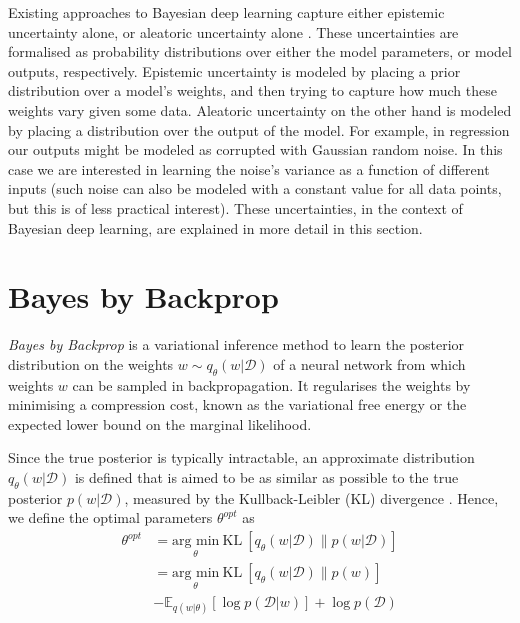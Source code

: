 Existing approaches to Bayesian deep learning capture either epistemic uncertainty alone, or aleatoric uncertainty alone \cite{gal2016thesis}. These uncertainties are formalised as probability distributions over either the model parameters, or model outputs, respectively. Epistemic uncertainty is modeled by placing a prior distribution over a model's weights, and then trying to capture how much these weights vary given some data. Aleatoric uncertainty on the other hand is modeled by placing a distribution over the output of the model. For example, in regression our outputs might be modeled as corrupted with Gaussian random noise. In this case we are interested in learning the noise's variance as a function of different inputs (such noise can also be modeled with a constant value for all data points, but this is of less practical interest). These uncertainties, in the context of Bayesian deep learning, are explained in more detail in this section. 

\section{Bayes by Backprop}
\textit{Bayes by Backprop} \cite{graves2011practical, blundell2015weight} is a variational inference method to learn the posterior distribution on the weights $w \sim q_{\theta}(w|\mathcal{D})$ of a neural network from which weights $w$ can be sampled in backpropagation. 
It regularises the weights by minimising a compression cost, known as the variational free energy or the expected lower bound on the marginal likelihood.

Since the true posterior is typically intractable, an approximate distribution $q_{\theta}(w|\mathcal{D})$ is defined that is aimed to be as similar as possible to the true posterior $p(w|\mathcal{D})$, measured by the Kullback-Leibler (KL) divergence \cite{kullback1951information}. Hence, we define the optimal parameters $\theta^{opt}$ as
\begin{equation}
    \begin{aligned} \label{KL}
        \theta^{opt}&=\underset{\theta}{\text{arg min}}\ \text{KL} \ [q_{\theta}(w|\mathcal{D})\|p(w|\mathcal{D})] \\
        &=\underset{\theta}{\text{arg min}}\ \text{KL} \ [q_{\theta}(w|\mathcal{D})\|p(w)] \\ & -\mathbb{E}_{q(w|\theta)}[\log p(\mathcal{D}|w)]+\log p(\mathcal{D})
    \end{aligned}
\end{equation}

